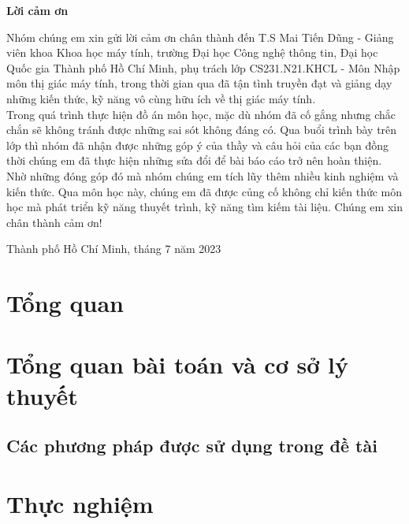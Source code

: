 \documentclass[a4paper,12pt]{article}
\begin{document}
\setcounter{secnumdepth}{5}

\begin{titlepage}
    \begin{center}
        \textbf{\Large Lời cảm ơn}
    \end{center}
    Nhóm chúng em xin gửi lời cảm ơn chân thành đến T.S Mai Tiến Dũng - Giảng viên khoa Khoa học máy tính, trường Đại học Công nghệ thông tin, Đại học Quốc gia Thành phố Hồ Chí Minh, phụ trách lớp CS231.N21.KHCL - Môn Nhập môn thị giác máy tính, trong thời gian qua đã tận tình truyền đạt và giảng dạy những kiến thức, kỹ năng vô cùng hữu ích về thị giác máy tính.
    \vspace{5mm}
    \\
    Trong quá trình thực hiện đồ án môn học, mặc dù nhóm đã cố gắng nhưng chắc chắn sẽ không tránh được những sai sót không đáng có. Qua buổi trình bày trên lớp thì nhóm đã nhận được những góp ý của thầy và câu hỏi của các bạn đồng thời chúng em đã thực hiện những sửa đổi để bài báo cáo trở nên hoàn thiện. Nhờ những đóng góp đó mà nhóm chúng em tích lũy thêm nhiều kinh nghiệm và kiến thức. Qua môn học này, chúng em đã được củng cố không chỉ kiến thức môn học mà phát triển kỹ năng thuyết trình, kỹ năng tìm kiếm tài liệu. Chúng em xin chân thành cảm ơn!
    \begin{flushright}
        Thành phố Hồ Chí Minh, tháng 7 năm 2023
    \end{flushright}
\end{titlepage}
\tableofcontents
\pagebreak

\section{Tổng quan}


\section{Tổng quan bài toán và cơ sở lý thuyết}


\subsection{Các phương pháp được sử dụng trong đề tài}



\section{Thực nghiệm}







\pagebreak


\end{document}
